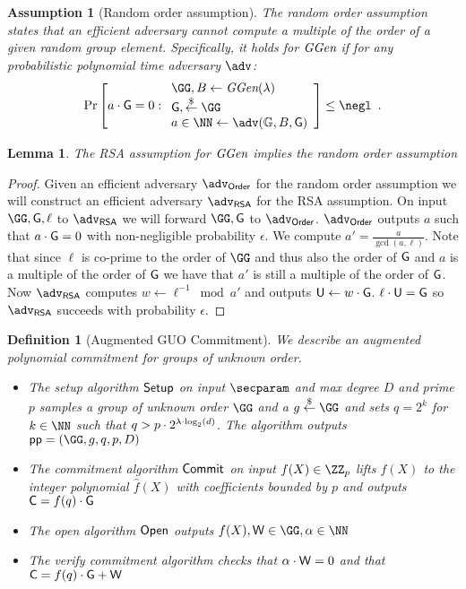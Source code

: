 \documentclass[12pt]{article}
\theoremstyle{Definition}
\newtheorem{definition}{Definition}
\newtheorem{lemma}{Lemma}
\newtheorem{assumption}{Assumption}
\begin{document}
\begin{assumption}[Random order assumption]
	The random order assumption states that an efficient adversary cannot compute a multiple of the order of a given random group element. Specifically, it holds for $\textit{GGen}$ if for any probabilistic polynomial time adversary $\adv$:
	\[
    \Pr\left[a\cdot \Generator =0:
    \begin{array}{l}
         \GG,B \leftarrow \ggen(\lambda)  \\
         \Generator, \sample \GG\\
         a \in \NN \leftarrow \adv(\mathbb{G},B, \Generator) \\
    \end{array}\right] \leq \negl \enspace .
    \]
\end{assumption}
\begin{lemma}
\label{lem:roa-to-rsa}
	The RSA assumption for $\textit{GGen}$ implies the random order assumption
	\end{lemma}
\begin{proof}
	Given an efficient adversary $\adv_{\textsf{Order}}$ for the random order assumption we will construct an efficient adversary $\adv_{\textsf{RSA}}$ for the RSA assumption. On input $\GG,\Generator,\ell$ to $\adv_{\textsf{RSA}}$ we will forward $\GG,\Generator$ to $\adv_{\textsf{Order}}$. $\adv_{\textsf{Order}}$ outputs $a$ such that $a\cdot \mathsf{G}=0$ with non-negligible probability $\epsilon$. 
	We compute $a'=\frac{a}{\gcd(a,\ell)}$. Note that since $\ell$ is co-prime to the order of $\GG$ and thus also the order of $\mathsf{G}$ and $a$ is a multiple of the order of $\mathsf{G}$ we have that $a'$ is still a multiple of the order of $\mathsf{G}$. Now $\adv_{\textsf{RSA}}$ computes $w\gets \ell^{-1} \bmod a'$ and outputs $\mathsf{U} \gets w\cdot \mathsf{G}$. $\ell \cdot \mathsf{U}=\mathsf{G}$ so $\adv_{\textsf{RSA}}$ succeeds with probability $\epsilon$.
\end{proof}
\begin{definition}[Augmented GUO Commitment]
We describe an augmented polynomial commitment for groups of unknown order.
\begin{itemize}
	\item 
The setup algorithm $\textsf{{Setup}}$ on input $\secparam$ and max degree $D$ and prime $p$ samples a group of unknown order $\GG$ and a $g\sample \GG$ and sets $q=2^k$ for $k \in \NN$ such that $q>p\cdot 2^{\lambda \cdot \log_2(d)}$. The algorithm outputs $\crs=(\GG,g,q,p,D)$

\item The commitment algorithm $\textsf{{Commit}}$ on input $f(X)\in \ZZ_p$ lifts $f(X)$ to the integer polynomial $\hat{f}(X)$ with coefficients bounded by $p$ and outputs $\mathsf{C} =f(q) \cdot \mathsf{G}$
\item The open algorithm $\textsf{{Open}}$ outputs $f(X),\gr{W} \in \GG,\alpha \in \NN$
\item The verify commitment algorithm checks that $\alpha\cdot \mathsf{W}=0$ and that $\mathsf{C} =f(q)\cdot \mathsf{G} +\mathsf{W}$
\end{itemize}

\end{definition}
\end{document}
